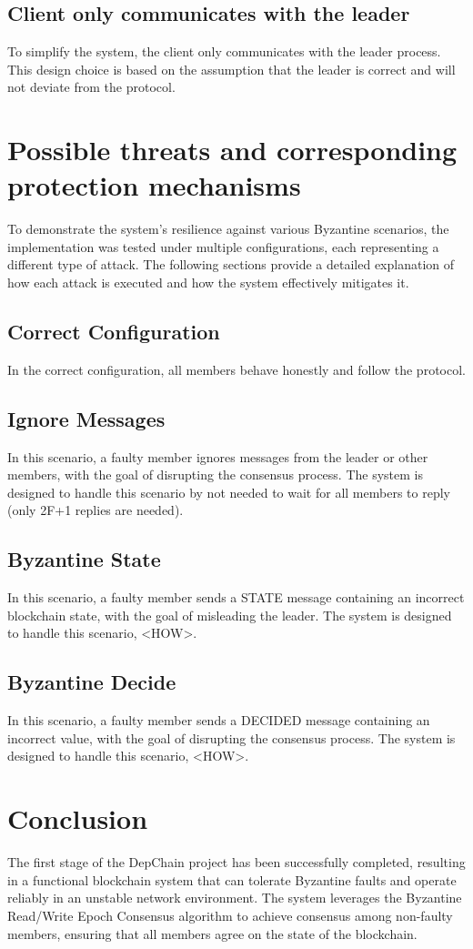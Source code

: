 \documentclass[runningheads]{llncs}
\begin{document}
\subsection{Client only communicates with the leader}
To simplify the system, the client only communicates with the leader process.
This design choice is based on the assumption that the leader is correct and
will not deviate from the protocol.
%
\section{Possible threats and corresponding protection mechanisms} To
demonstrate the system's resilience against various Byzantine scenarios, the
implementation was tested under multiple configurations, each representing a
different type of attack. The following sections provide a detailed explanation
of how each attack is executed and how the system effectively mitigates it.
\subsection{Correct Configuration}
In the correct configuration, all members behave honestly and follow the
protocol.
%
\subsection{Ignore Messages}
In this scenario, a faulty member ignores messages from the leader or other
members, with the goal of disrupting the consensus process. The system is
designed to handle this scenario by not needed to wait for all members to reply
(only 2F+1 replies are needed).
%
\subsection{Byzantine State}
In this scenario, a faulty member sends a STATE message containing an incorrect
blockchain state, with the goal of misleading the leader. The system is designed
to handle this scenario, <HOW>.
%
\subsection{Byzantine Decide}
In this scenario, a faulty member sends a DECIDED message containing an
incorrect value, with the goal of disrupting the consensus process. The system
is designed to handle this scenario, <HOW>.
%
\section{Conclusion}
The first stage of the DepChain project has been successfully completed,
resulting in a functional blockchain system that can tolerate Byzantine faults
and operate reliably in an unstable network environment. The system leverages
the Byzantine Read/Write Epoch Consensus algorithm to achieve consensus among
non-faulty members, ensuring that all members agree on the state of the
blockchain.
\end{document}
